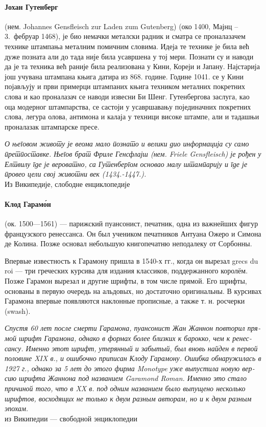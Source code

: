 \documentclass[pagesize,DIV14]{scrartcl}
\begin{document}
\begin{multicols}{2}
\begin{serbian}
\paragraph*{Јохан Гутенберг} (нем. Johannes Gensfleisch zur Laden zum Gutenberg) (око 1400, Мајнц – 3.~фебруар 1468), је био немачки металски радник и сматра се проналазачем технике штампања металним помичним словима. Идеја те технике је била већ дуже позната али до тада није била усавршена у тој мери. Познати су и наводи да је та техника већ раније била реализована у Кини, Кореји и Јапану. Најстарија још учувана штампана књига датира из 868. године. Године 1041. се у Кини појављују и први примерци штампаних књига техником металних покретних слова и као проналазач се наводи извесни Би Шенг. Гутенбергова заслуга, као оца модерног штампарства, се састоји у усавршавању појединачних покретних слова, легура олова, антимона и калаја у техници високе штампе, али и тадашњи проналазак штампарске пресе.\par
\textit{О његовом животу је веома мало познато и велики дио информација су само претпоставке. Његов брат Фриле Генсфлајш (нем. Friele Gensfleisch) је рођен у Елтвилу где је вероватно, са Гутенбергом основао малу штампарију и где је провео цели свој животни век (1434.-1447.).}\\
{\scriptsize Из Википедије, слободне енциклопедије}
\end{serbian}
\begin{russian}
\paragraph*{Клод Гарамо́н} (ок. 1500—1561) — парижский пуансонист, печатник, одна из важнейших фигур французского ренессанса. Он был учеником печатников Антуана Ожеро и Симона де Колина. Позже основал небольшую книгопечатню неподалеку от Сорбонны.\par
Впервые известность к Гарамону пришла в 1540-х гг., когда он вырезал grecs du roi — три греческих курсива для издания классиков, поддержанного королём. Позже Гарамон вырезал и другие шрифты, в том числе прямой. Его шрифты, основаны в первую очередь на альдовых, но достаточно оригинальны. В курсивах Гарамона впервые появляются наклонные прописные, а также т. н. росчерки (swash).\par
\textit{Спустя 60 лет после смерти Гарамона, пуансонист Жан Жаннон повторил прямой шрифт Гарамона, однако в формах более близких к барокко, чем к ренессансу. Именно этот шрифт, утерянный и забытый, был вновь найден в первой половине XIX в., и ошибочно приписан Клоду Гарамону. Ошибка обнаружилась в 1927 г., однако за 5 лет до этого фирма Monotype уже выпустила новую версию шрифта Жаннона под названием Garamond Roman. Именно это стало причиной того, что в XX в. под одним названием было выпущено несколько шрифтов, восходящих не только к двум разным авторам, но и к двум разным эпохам.}
\\
{\scriptsize из Википедии — свободной энциклопедии}
\end{russian}
\begin{bulgarian}

\end{bulgarian}
\end{multicols}
\end{document}
